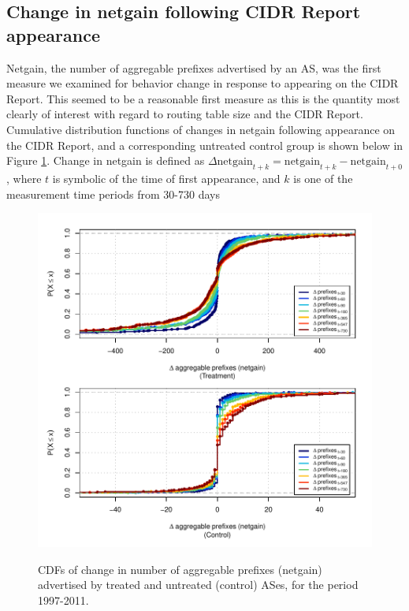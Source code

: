 \subsection{Change in netgain following CIDR Report appearance}

Netgain, the number of aggregable prefixes advertised by an AS, was the first
measure we examined for behavior change in response to appearing on the CIDR
Report. This seemed to be a reasonable first measure as this is the quantity
most clearly of interest with regard to routing table size and the CIDR Report.
Cumulative distribution functions of changes in netgain following appearance on
the CIDR Report, and a corresponding untreated control group is shown below in
Figure \ref{fig:delta_netgain_cdf}. Change in netgain is defined as
$\Delta\textrm{netgain}_{t+k} = \textrm{netgain}_{t+k} -
\textrm{netgain}_{t+0}$, where $t$ is symbolic of the time of first appearance,
and $k$ is one of the measurement time periods from 30-730 days

\begin{figure}[h!]
\begin{centering}
\begin{singlespace}
    \includegraphics[width=6in]{figures/behavior-netgain-1997_2011-corr.pdf}
    \vspace{-2em}\\
    \caption{CDFs of change in number of aggregable prefixes (netgain)
    advertised by treated and untreated (control) ASes, for the period
    1997-2011.}
    \label{fig:delta_netgain_cdf}
\end{singlespace}
\end{centering}
\end{figure}

